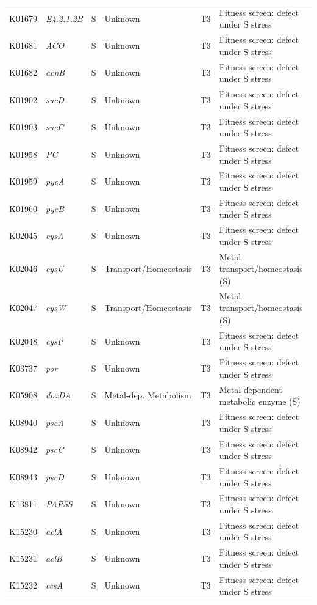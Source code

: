 \documentclass[11pt]{article}
\begin{document}
\begin{longtable}{lllllp{4.8cm}}
K01679 & \textit{E4.2.1.2B} & S & Unknown & T3 & Fitness screen: defect under S stress \\
K01681 & \textit{ACO} & S & Unknown & T3 & Fitness screen: defect under S stress \\
K01682 & \textit{acnB} & S & Unknown & T3 & Fitness screen: defect under S stress \\
K01902 & \textit{sucD} & S & Unknown & T3 & Fitness screen: defect under S stress \\
K01903 & \textit{sucC} & S & Unknown & T3 & Fitness screen: defect under S stress \\
K01958 & \textit{PC} & S & Unknown & T3 & Fitness screen: defect under S stress \\
K01959 & \textit{pycA} & S & Unknown & T3 & Fitness screen: defect under S stress \\
K01960 & \textit{pycB} & S & Unknown & T3 & Fitness screen: defect under S stress \\
K02045 & \textit{cysA} & S & Unknown & T3 & Fitness screen: defect under S stress \\
K02046 & \textit{cysU} & S & Transport/Homeostasis & T3 & Metal transport/homeostasis (S) \\
K02047 & \textit{cysW} & S & Transport/Homeostasis & T3 & Metal transport/homeostasis (S) \\
K02048 & \textit{cysP} & S & Unknown & T3 & Fitness screen: defect under S stress \\
K03737 & \textit{por} & S & Unknown & T3 & Fitness screen: defect under S stress \\
K05908 & \textit{doxDA} & S & Metal-dep. Metabolism & T3 & Metal-dependent metabolic enzyme (S) \\
K08940 & \textit{pscA} & S & Unknown & T3 & Fitness screen: defect under S stress \\
K08942 & \textit{pscC} & S & Unknown & T3 & Fitness screen: defect under S stress \\
K08943 & \textit{pscD} & S & Unknown & T3 & Fitness screen: defect under S stress \\
K13811 & \textit{PAPSS} & S & Unknown & T3 & Fitness screen: defect under S stress \\
K15230 & \textit{aclA} & S & Unknown & T3 & Fitness screen: defect under S stress \\
K15231 & \textit{aclB} & S & Unknown & T3 & Fitness screen: defect under S stress \\
K15232 & \textit{ccsA} & S & Unknown & T3 & Fitness screen: defect under S stress \\

\end{longtable}
\end{document}
